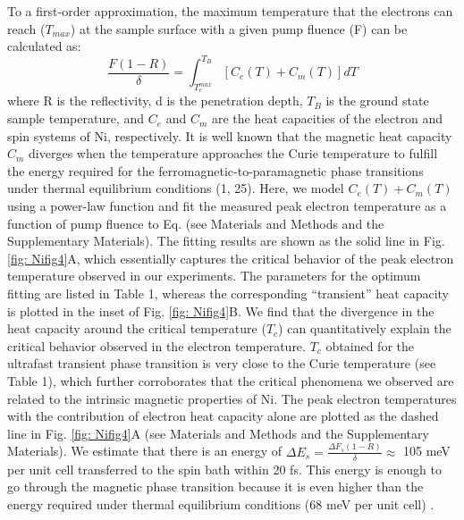 To a first-order approximation, the maximum temperature that the electrons can reach ($T_{max}$) at the sample surface with a given pump fluence (F) can be calculated as:
\begin{equation}
\frac{F(1-R)}{\delta}=\int_{T_{e}^{max}}^{T_{B}}[C_{e}(T)+C_{m}(T)]dT
\label{eqn: 1}
\end{equation}
where R is the reflectivity, d is the penetration depth, $T_{B}$ is the ground state sample temperature, and $C_{e}$ and $C_{m}$ are the heat capacities of the electron and spin systems of Ni, respectively. It is well known that the magnetic heat capacity $C_{m}$ diverges when the temperature approaches the Curie temperature to fulfill the energy required for the ferromagnetic-to-paramagnetic phase transitions under thermal equilibrium conditions \cite{Stohr2006,Meschter1981}(1, 25). Here, we model $C_{e}(T)+C_{m}(T)$ using a power-law function and fit the measured peak electron temperature as a function of pump fluence to Eq.  (see Materials and Methods and the Supplementary Materials). The fitting results are shown as the solid line in Fig. \ref{fig: Nifig4}A, which essentially captures the critical behavior of the peak electron temperature observed in our experiments. The parameters for the optimum fitting are listed in Table 1, whereas the corresponding “transient” heat capacity is plotted in the inset of Fig. \ref{fig: Nifig4}B. We find that the divergence in the heat capacity around the critical temperature ($T_{c}$) can quantitatively explain the critical behavior observed in the electron temperature. $T_{c}$ obtained for the ultrafast transient phase transition is very close to the Curie temperature (see Table 1), which further corroborates that the critical phenomena we observed are related to the intrinsic magnetic properties of Ni. The peak electron temperatures with the contribution of electron heat capacity alone are plotted as the dashed line in Fig. \ref{fig: Nifig4}A (see Materials and Methods and the Supplementary Materials). We estimate that there is an energy of $\Delta E_{s}=\frac{\Delta F_{s}(1-R)}{\delta}\approx$ 105 meV per unit cell transferred to the spin bath within 20 fs. This energy is enough to go through the magnetic phase transition because it is even higher than the energy required under thermal equilibrium conditions (68 meV per unit cell) \cite{Meschter1981}.

